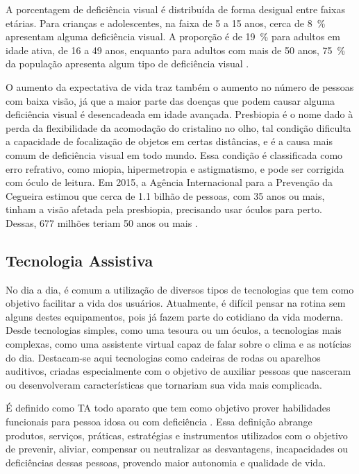 A porcentagem de deficiência visual é distribuída de forma desigual entre faixas etárias.
Para crianças e adolescentes, na faixa de 5 a 15 anos, cerca de \SI{8}{\percent} apresentam alguma deficiência visual.
A proporção é de \SI{19}{\percent} para adultos em idade ativa, de 16 a 49 anos, enquanto para adultos com mais de 50 anos, \SI{75}{\percent} da população apresenta algum tipo de deficiência visual \cite{CBO2013condicoes}.

O aumento da expectativa de vida traz também o aumento no número de pessoas com baixa visão, já que a maior parte das doenças que podem causar alguma deficiência visual é desencadeada em idade avançada.
Presbiopia é o nome dado à perda da flexibilidade da acomodação do cristalino no olho, tal condição dificulta a capacidade de focalização de objetos em certas distâncias, e é a causa mais comum de deficiência visual em todo mundo.
Essa condição é classificada como erro refrativo, como miopia, hipermetropia e astigmatismo, e pode ser corrigida com óculo de leitura.
Em 2015, a Agência Internacional para a Prevenção da Cegueira estimou que cerca de \num{1,1} bilhão de pessoas, com 35 anos ou mais, tinham a visão afetada pela presbiopia, precisando usar óculos para perto.
Dessas, \num{677} milhões teriam 50 anos ou mais \cite{CBO2013condicoes}.



\subsection{Tecnologia Assistiva}

No dia a dia, é comum a utilização de diversos tipos de tecnologias que tem como objetivo facilitar a vida dos usuários.
Atualmente, é difícil pensar na rotina sem alguns destes equipamentos, pois já fazem parte do cotidiano da vida moderna.
Desde tecnologias simples, como uma tesoura ou um óculos, a tecnologias mais complexas, como uma assistente virtual capaz de falar sobre o clima e as notícias do dia.
Destacam-se aqui tecnologias como cadeiras de rodas ou aparelhos auditivos, criadas especialmente com o objetivo de auxiliar pessoas que nasceram ou desenvolveram características que tornariam sua vida mais complicada.

É definido como \ac{TA} todo aparato que tem como objetivo prover habilidades funcionais para pessoa idosa ou com deficiência \cite{bersch2008introduccao}.
Essa definição abrange produtos, serviços, práticas, estratégias e instrumentos utilizados com o objetivo de prevenir, aliviar, compensar ou neutralizar as desvantagens, incapacidades ou deficiências dessas pessoas, provendo maior autonomia e qualidade de vida.

